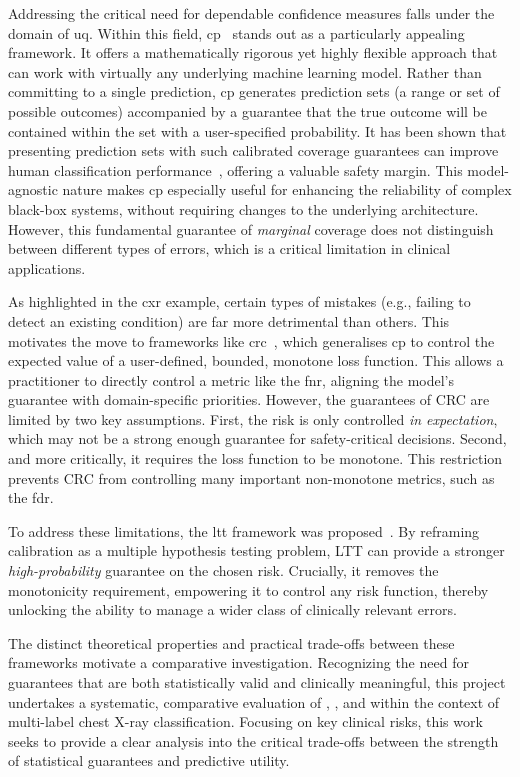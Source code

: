 Addressing the critical need for dependable confidence measures
falls under the domain of \gls{uq}.
Within this field, \gls{cp}~\cite{vovk2005algorithmic}
stands out as a particularly appealing framework.
It offers a mathematically rigorous yet highly flexible approach
that can work with virtually any underlying machine learning model.
Rather than committing to a single prediction,
\gls{cp} generates prediction sets (a range or set of possible outcomes)
accompanied by a guarantee that the true outcome will be contained
within the set with a user-specified probability.
It has been shown that presenting prediction sets with such calibrated coverage guarantees
can improve human classification performance~\cite{cresswell2024conformal, zhang2024evaluating},
offering a valuable safety margin.
This model-agnostic nature makes \gls{cp} especially useful for
enhancing the reliability of complex black-box systems,
without requiring changes to the underlying architecture.
However, this fundamental guarantee of \emph{marginal} coverage
does not distinguish between different types of errors,
which is a critical limitation in clinical applications.

As highlighted in the \gls{cxr} example, certain types of mistakes
(e.g., failing to detect an existing condition)
are far more detrimental than others.
This motivates the move to frameworks like \gls{crc}~\cite{angelopoulos2023crc},
which generalises \gls{cp} to control the expected value of a
user-defined, bounded, monotone loss function.
This allows a practitioner to directly control a metric
like the \gls{fnr}, aligning the model's guarantee with domain-specific priorities.
However, the guarantees of CRC are limited by two key assumptions.
First, the risk is only controlled \emph{in expectation},
which may not be a strong enough guarantee for safety-critical decisions.
Second, and more critically, it requires the loss function to be monotone.
This restriction prevents CRC from controlling many important non-monotone metrics,
such as the \gls{fdr}.

To address these limitations, the \gls{ltt} framework was proposed~\cite{angelopoulos2022ltt}.
By reframing calibration as a multiple hypothesis testing problem,
LTT can provide a stronger \emph{high-probability} guarantee on the chosen risk.
Crucially, it removes the monotonicity requirement,
empowering it to control any risk function,
thereby unlocking the ability to manage a wider class of clinically relevant errors.

The distinct theoretical properties and practical trade-offs between these frameworks
motivate a comparative investigation.
Recognizing the need for guarantees that are both
statistically valid and clinically meaningful,
this project undertakes a systematic, comparative evaluation of ,
, and 
within the context of multi-label chest X-ray classification.
Focusing on key clinical risks, this work seeks to provide
a clear analysis into the critical trade-offs
between the strength of statistical guarantees and predictive utility.

